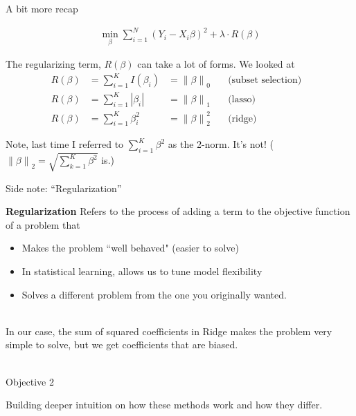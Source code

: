 \documentclass[mathserif, handout, aspectratio=169]{beamer}
\newcommand{\norm}[1]{\left\lVert #1 \right\rVert}
\begin{document}
\begin{frame}{A bit more recap}

\begin{align*}
\min_\beta \sum_{i=1}^N \left(Y_i - X_i \beta \right)^2+\lambda \cdot R(\beta)\end{align*}

The regularizing term, $R(\beta)$ can take a lot of forms.  We looked at
\begin{align*}
R(\beta) & =\sum_{i=1}^K I(\beta_i) &= \norm{\beta}_0 & \quad \text{(subset selection)} &\\
R(\beta) & =\sum_{i=1}^K |\beta_i| & = \norm{\beta}_1 & \quad \text{(lasso)} &\\
R(\beta) & =\sum_{i=1}^K \beta_i^2 & = \norm{\beta}_2^2 & \quad \text{(ridge)} &
\end{align*}

Note, last time I referred to $\sum_{i=1}^K \beta^2$ as the 2-norm.  It's not!  ($\norm{\beta}_2 = \sqrt{\sum_{k=1}^K \beta^2}$ is.)

\end{frame}


\begin{frame}{Side note:  ``Regularization''}

\textbf{Regularization} Refers to the process of adding a term to the objective function of a problem that 
\begin{itemize}
\item Makes the problem ``well behaved" (easier to solve)
\item In statistical learning, allows us to tune model flexibility
\item Solves a different problem from the one you originally wanted.\\~\\
\end{itemize}

In our case, the sum of squared coefficients in Ridge makes the problem very simple to solve, but we get coefficients that are biased.\\~\\


\end{frame}


\begin{frame}{Objective 2}


Building deeper intuition on how these methods work and how they differ.  
\end{frame}
\end{document}
